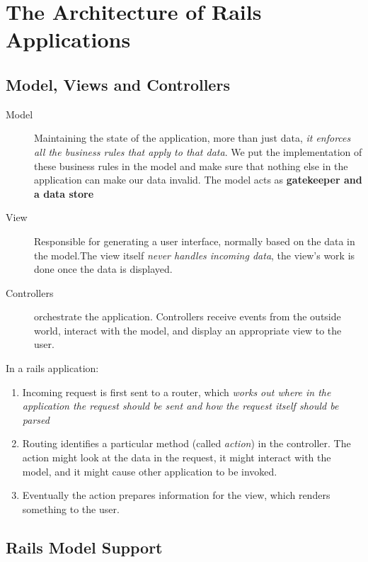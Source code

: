 \documentclass[11pt, a4paper]{book}
\begin{document}
\chapter{The Architecture of Rails Applications}
\section{Model, Views and Controllers}
\begin{description}
\item [Model] Maintaining the state of the application, more than just data,
\emph{it enforces all the business rules that apply to that data}. We put the
implementation of these business rules in the model and make sure that nothing
else in the application can make our data invalid. The model acts as
\textbf{gatekeeper and a data store}

\item [View] Responsible for generating a user interface, normally based on the
data in the model.The view itself \emph{never handles incoming data}, the view's
work is done once the data is displayed. 

\item [Controllers] orchestrate the application. Controllers receive events
from the outside world, interact with the model, and display an appropriate view
to the user. 
\end{description}

In a rails application:
\begin{enumerate}
\item Incoming request is first sent to a router, which \emph{works out where in
the application the request should be sent and how the request itself should be
parsed}
\item Routing identifies a particular method (called \emph{action}) in the
controller. The action might look at the data in the request, it might interact
with the model, and it might cause other application to be invoked.
\item Eventually the action prepares information for the view, which renders
something to the user.
\end{enumerate}
\section{Rails Model Support}
\end{document}

